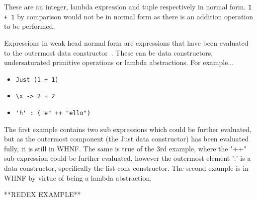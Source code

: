 These are an integer, lambda expression and tuple respectively in normal form. \verb!1 + 1!
by comparison would not be in normal form as there is an addition operation to
be performed.

Expressions in weak head normal form are expressions that have been evaluated
to the outermost data constructor~\cite[pp.198]{SPJ}. These can be data constructors, undersaturated
primitive operations or lambda abstractions. For example...
\begin{itemize}
	\item \verb!Just (1 + 1)!
	\item \verb!\x -> 2 + 2!
	\item \verb!'h' : ("e" ++ "ello")!
\end{itemize}
The first example contains two sub expressions which could be further evaluated,
but as the outermost component (the Just data constructor) has been evaluated 
fully, it is still in WHNF. The same is true of the 3rd example, where the "++"
sub expression could be further evaluated, however the outermost element
':' is a data constructor, specifically the list cons constructor. The second
example is in WHNF by virtue of being a lambda abstraction.


**REDEX EXAMPLE**

